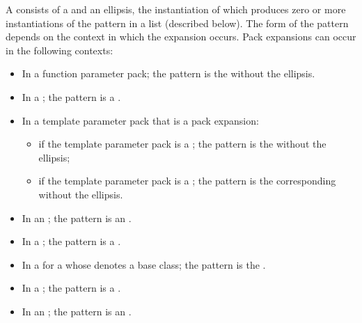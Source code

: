 \pnum
{}%
A 
consists of a  and an ellipsis, the instantiation of which
produces zero or more instantiations of the pattern in a list (described below).
The form of the pattern
depends on the context in which the expansion occurs. Pack
expansions can occur in the following contexts:
\begin{itemize}
\item In a function parameter pack; the pattern is the
 without the ellipsis.

\item In a ;
the pattern is a .

\item In a template parameter pack that is a pack expansion:
\begin{itemize}
\item
if the template parameter pack is a ;
the pattern is the  without the ellipsis;

\item
if the template parameter pack is a ;
the pattern is the corresponding 
without the ellipsis.
\end{itemize}

\item In an ;
the pattern is an .

\item In a ;
the pattern is a .

\item In a  for a
 whose  denotes a
base class; the pattern is the .

\item In a ;
the pattern is a .

\item In an ; the pattern is
an .


\end{itemize}
